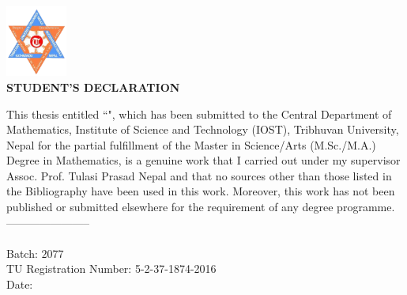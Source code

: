 

\begin{center}
  \includegraphics[width=0.15\textwidth]{pictures/tulogo.png}\\[1.5cm]

    {\Large{\bfseries{STUDENT'S DECLARATION}}}\\[.5cm]

  \end{center}


This thesis entitled ``\textbf{\thetitle}", which has been submitted to the Central Department of Mathematics, Institute of Science and Technology (IOST), Tribhuvan University, Nepal for the partial fulfillment of the Master in Science/Arts (M.Sc./M.A.) Degree  in Mathematics, is a genuine work that I carried out under my supervisor {\color{red} Assoc. Prof. Tulasi Prasad Nepal} and that no sources other than those listed in the Bibliography have been used in this work. Moreover, this work has not been published or submitted elsewhere for the requirement of any degree programme.
\\[1.5cm]
-----------------------\\
\theauthor\\
Batch: $2077$ \\
TU Registration Number: 5-2-37-1874-2016\\
Date: \thedate

\clearpage
